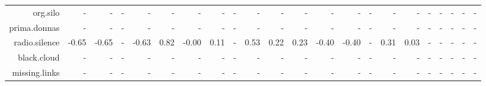 \documentclass{article}
\begin{document}
\begin{center}
\begin{tabular}{rrrrrrrrrrrrrrrrrrrrrr}
  \hline
org.silo & - & - & - & - & - & - & - & - & - & - & - & - & - & - & - & - & - & - & - & - & - \\ 
  prima.donnas & - & - & - & - & - & - & - & - & - & - & - & - & - & - & - & - & - & - & - & - & - \\ 
  radio.silence & -0.65 & -0.65 & - & -0.63 & 0.82 & -0.00 & 0.11 & - & 0.53 & 0.22 & 0.23 & -0.40 & -0.40 & - & 0.31 & 0.03 & - & - & - & - & - \\ 
  black.cloud & - & - & - & - & - & - & - & - & - & - & - & - & - & - & - & - & - & - & - & - & - \\ 
  missing.links & - & - & - & - & - & - & - & - & - & - & - & - & - & - & - & - & - & - & - & - & - \\ 
   \hline
\end{tabular}


\end{center}
\end{document}
